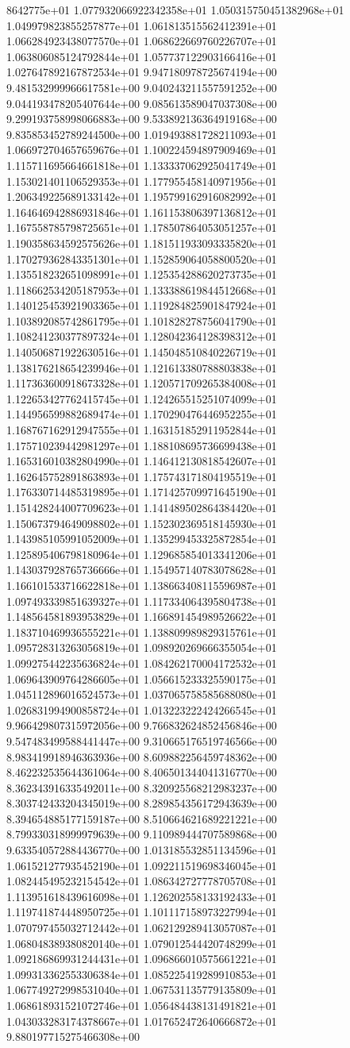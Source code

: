 8642775e+01	1.077932066922342358e+01	1.050315750451382968e+01	1.049979823855257877e+01	1.061813515562412391e+01	1.066284923438077570e+01	1.068622669760226707e+01	1.063806085124792844e+01	1.057737122903166416e+01	1.027647892167872534e+01	9.947180978725674194e+00	9.481532999966617581e+00	9.040243211557591252e+00	9.044193478205407644e+00	9.085613589047037308e+00	9.299193758998066883e+00	9.533892136364919168e+00	9.835853452789244500e+00	1.019493881728211093e+01	1.066972704657659676e+01	1.100224594897909469e+01	1.115711695664661818e+01	1.133337062925041749e+01	1.153021401106529353e+01	1.177955458140971956e+01	1.206349225689133142e+01	1.195799162916082992e+01	1.164646942886931846e+01	1.161153806397136812e+01	1.167558785798725651e+01	1.178507864053051257e+01	1.190358634592575626e+01	1.181511933093335820e+01	1.170279362843351301e+01	1.152859064058800520e+01	1.135518232651098991e+01	1.125354288620273735e+01	1.118662534205187953e+01	1.133388619844512668e+01	1.140125453921903365e+01	1.119284825901847924e+01	1.103892085742861795e+01	1.101828278756041790e+01	1.108241230377897324e+01	1.128042364128398312e+01	1.140506871922630516e+01	1.145048510840226719e+01	1.138176218654239946e+01	1.121613380788803838e+01	1.117363600918673328e+01	1.120571709265384008e+01	1.122653427762415745e+01	1.124265515251074099e+01	1.144956599882689474e+01	1.170290476446952255e+01	1.168767162912947555e+01	1.163151852911952844e+01	1.175710239442981297e+01	1.188108695736699438e+01	1.165316010382804990e+01	1.146412130818542607e+01	1.162645752891863893e+01	1.175743171804195519e+01	1.176330714485319895e+01	1.171425709971645190e+01	1.151428244007709623e+01	1.141489502864384420e+01	1.150673794649098802e+01	1.152302369518145930e+01	1.143985105991052009e+01	1.135299453325872854e+01	1.125895406798180964e+01	1.129685854013341206e+01	1.143037928765736666e+01	1.154957140783078628e+01	1.166101533716622818e+01	1.138663408115596987e+01	1.097493339851639327e+01	1.117334064395804738e+01	1.148564581893953829e+01	1.166891454989526622e+01	1.183710469936555221e+01	1.138809989829315761e+01	1.095728313263056819e+01	1.098920269666355054e+01	1.099275442235636824e+01	1.084262170004172532e+01	1.069643909764286605e+01	1.056615233325590175e+01	1.045112896016524573e+01	1.037065758585688080e+01	1.026831994900858724e+01	1.013223222424266545e+01	9.966429807315972056e+00	9.766832624852456846e+00	9.547483499588441447e+00	9.310665176519746566e+00	8.983419918946363936e+00	8.609882256459748362e+00	8.462232535644361064e+00	8.406501344041316770e+00	8.362343916335492011e+00	8.320925568212983237e+00	8.303742433204345019e+00	8.289854356172943639e+00	8.394654885177159187e+00	8.510664621689221221e+00	8.799330318999979639e+00	9.110989444707589868e+00	9.633540572884436770e+00	1.013185532851134596e+01	1.061521277935452190e+01	1.092211519698346045e+01	1.082445495232154542e+01	1.086342727778705708e+01	1.113951618439616098e+01	1.126202558133192433e+01	1.119741874448950725e+01	1.101117158973227994e+01	1.070797455032712442e+01	1.062129289413057087e+01	1.068048389380820140e+01	1.079012544420748299e+01	1.092186869931244431e+01	1.096866010575661221e+01	1.099313362553306384e+01	1.085225419289910853e+01	1.067749272998531040e+01	1.067531135779135809e+01	1.068618931521072746e+01	1.056484438131491821e+01	1.043033283174378667e+01	1.017652472640666872e+01	9.880197715275466308e+00